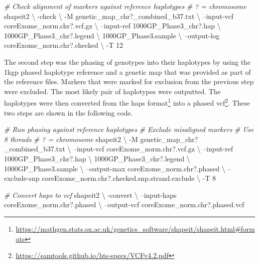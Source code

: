 \documentclass[twoside,openright]{report}
\newenvironment{Shaded}{\begin{snugshade}}{\end{snugshade}}
\newcommand{\CommentTok}[1]{\textcolor[rgb]{0.56,0.35,0.01}{\textit{#1}}}
\newcommand{\ExtensionTok}[1]{#1}
\newcommand{\NormalTok}[1]{#1}
\begin{document}
\begin{Shaded}
\begin{Highlighting}[]
\CommentTok{# Check alignment of markers against reference haplotypes}
\CommentTok{# ? = chromosome}
\ExtensionTok{shapeit2}\NormalTok{ \textbackslash{}}
\NormalTok{-check \textbackslash{}}
\NormalTok{-M genetic_map_chr?_combined_b37.txt \textbackslash{}}
\NormalTok{--input-vcf coreExome_norm.chr?.vcf.gz \textbackslash{}}
\NormalTok{--input-ref 1000GP_Phase3_chr?.hap \textbackslash{}}
\NormalTok{  1000GP_Phase3_chr?.legend \textbackslash{}}
\NormalTok{  1000GP_Phase3.sample \textbackslash{}}
\NormalTok{  --output-log coreExome_norm.chr?.checked \textbackslash{}}
\NormalTok{  -T 12}
\end{Highlighting}
\end{Shaded}

The second step was the phasing of genotypes into their haplotypes by
using the \gls{1kgp} phased haplotype reference and a genetic map that
was provided as part of the reference files. Markers that were marked
for exclusion from the previous step were excluded. The most likely pair
of haplotypes were outputted. The haplotypes were then converted from
the haps format\footnote{\url{https://mathgen.stats.ox.ac.uk/genetics_software/shapeit/shapeit.html\#formats}}
into a phased \gls{vcf}\footnote{\url{https://samtools.github.io/hts-specs/VCFv4.2.pdf}}.
These two steps are shown in the following code.

\begin{Shaded}
\begin{Highlighting}[]
\CommentTok{# Run phasing against reference haplotypes}
\CommentTok{# Exclude misaligned markers}
\CommentTok{# Use 8 threads}
\CommentTok{# ? = chromosome}
\ExtensionTok{shapeit2}\NormalTok{ \textbackslash{}}
\NormalTok{-M genetic_map_chr?_combined_b37.txt \textbackslash{}}
\NormalTok{--input-vcf coreExome_norm.chr?.vcf.gz \textbackslash{}}
\NormalTok{--input-ref 1000GP_Phase3_chr?.hap \textbackslash{}}
\NormalTok{  1000GP_Phase3_chr?.legend \textbackslash{}}
\NormalTok{  1000GP_Phase3.sample \textbackslash{}}
\NormalTok{--output-max coreExome_norm.chr?.phased \textbackslash{}}
\NormalTok{--exclude-snp coreExome_norm.chr?.checked.snp.strand.exclude \textbackslash{}}
\NormalTok{-T 8}

\CommentTok{# Convert haps to vcf}
\ExtensionTok{shapeit2}\NormalTok{ \textbackslash{}}
\NormalTok{-convert \textbackslash{}}
\NormalTok{--input-haps coreExome_norm.chr?.phased \textbackslash{}}
\NormalTok{--output-vcf coreExome_norm.chr?.phased.vcf }
\end{Highlighting}
\end{Shaded}
\end{document}
